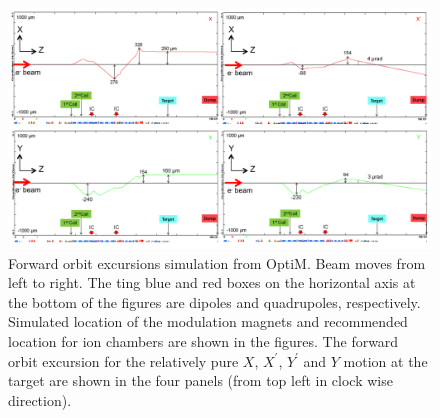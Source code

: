 \begin{singlespace}
\begin{figure}[!h]
	\begin{center}
	\includegraphics[width=15.0cm]{figures/BModForwardBeamline}
	\end{center}
	\caption
	{Forward orbit excursions simulation from OptiM. Beam moves from left to right. The ting blue and red boxes on the horizontal axis at the bottom of the figures are dipoles and quadrupoles, respectively. Simulated location of the modulation magnets and recommended location for ion chambers are shown in the figures. The forward orbit excursion for the relatively pure $X$, $X^{\prime}$, $Y^{\prime}$ and $Y$ motion at the target are shown in the four panels (from top left in clock wise direction).}
	\label{fig:BModForwardBeamline}
\end{figure}
\end{singlespace}



